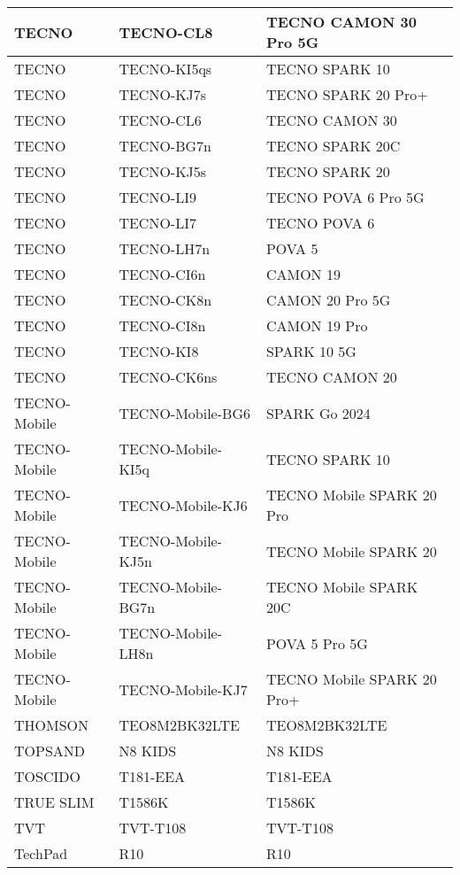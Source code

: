 \begin{tabularx}{\linewidth}{|l|X|X|}
        TECNO & TECNO-CL8 & TECNO CAMON 30 Pro 5G \\ \hline
        TECNO & TECNO-KI5qs & TECNO SPARK 10 \\ \hline
        TECNO & TECNO-KJ7s & TECNO SPARK 20 Pro+ \\ \hline
        TECNO & TECNO-CL6 & TECNO CAMON 30 \\ \hline
        TECNO & TECNO-BG7n & TECNO SPARK 20C \\ \hline
        TECNO & TECNO-KJ5s & TECNO SPARK 20 \\ \hline
        TECNO & TECNO-LI9 & TECNO POVA 6 Pro 5G \\ \hline
        TECNO & TECNO-LI7 & TECNO POVA 6 \\ \hline
        TECNO & TECNO-LH7n & POVA 5 \\ \hline
        TECNO & TECNO-CI6n & CAMON 19 \\ \hline
        TECNO & TECNO-CK8n & CAMON 20 Pro 5G \\ \hline
        TECNO & TECNO-CI8n & CAMON 19 Pro \\ \hline
        TECNO & TECNO-KI8 & SPARK 10 5G \\ \hline
        TECNO & TECNO-CK6ns & TECNO CAMON 20 \\ \hline
        TECNO-Mobile & TECNO-Mobile-BG6 & SPARK Go 2024 \\ \hline
        TECNO-Mobile & TECNO-Mobile-KI5q & TECNO SPARK 10 \\ \hline
        TECNO-Mobile & TECNO-Mobile-KJ6 & TECNO Mobile SPARK 20 Pro \\ \hline
        TECNO-Mobile & TECNO-Mobile-KJ5n & TECNO Mobile SPARK 20 \\ \hline
        TECNO-Mobile & TECNO-Mobile-BG7n & TECNO Mobile SPARK 20C \\ \hline
        TECNO-Mobile & TECNO-Mobile-LH8n & POVA 5 Pro 5G \\ \hline
        TECNO-Mobile & TECNO-Mobile-KJ7 & TECNO Mobile SPARK 20 Pro+ \\ \hline
        THOMSON & TEO8M2BK32LTE & TEO8M2BK32LTE \\ \hline
        TOPSAND & N8 KIDS & N8 KIDS \\ \hline
        TOSCIDO & T181-EEA & T181-EEA \\ \hline
        TRUE SLIM & T1586K & T1586K \\ \hline
        TVT & TVT-T108 & TVT-T108 \\ \hline
        TechPad & R10 & R10 \\ \hline

\end{tabularx}
